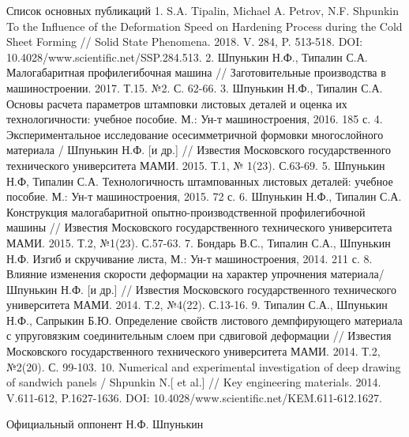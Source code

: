 Список основных публикаций
1. S.A. Tipalin, Michael A. Petrov, N.F. Shpunkin To the Influence of the Deformation Speed on Hardening Process during the Cold Sheet Forming // Solid State Phenomena. 2018. V. 284, P. 513-518. DOI: 10.4028/www.scientific.net/SSP.284.513.
2. Шпунькин Н.Ф., Типалин С.А. Малогабаритная профилегибочная машина // Заготовительные производства в машиностроении. 2017. Т.15. №2. 
С. 62-66.
3. Шпунькин Н.Ф., Типалин С.А. Основы расчета параметров штамповки листовых деталей и оценка их технологичности: учебное пособие. М.: Ун-т машиностроения, 2016. 185 с.
4. Экспериментальное исследование осесимметричной формовки многослойного материала / Шпунькин Н.Ф. [и др.] // Известия Московского государственного технического университета МАМИ. 2015. Т.1, № 1(23). С.63-69. 
5. Шпунькин Н.Ф, Типалин С.А. Технологичность штампованных листовых деталей: учебное пособие. М.: Ун-т машиностроения, 2015. 72 с.
6. Шпунькин Н.Ф., Типалин С.А. Конструкция малогабаритной опытно-производственной профилегибочной машины // Известия Московского государственного технического университета МАМИ. 2015. Т.2, №1(23). С.57-63.
7. Бондарь В.С., Типалин С.А., Шпунькин Н.Ф. Изгиб и скручивание листа, М.: Ун-т машиностроения, 2014. 211 с.
8. Влияние изменения скорости деформации на характер упрочнения материала/ Шпунькин Н.Ф. [и др.] // Известия Московского государственного технического университета МАМИ. 2014. Т.2, №4(22). С.13-16.
9. Типалин С.А., Шпунькин Н.Ф., Сапрыкин Б.Ю. Определение свойств листового демпфирующего материала с упруговязким соединительным слоем при сдвиговой деформации // Известия Московского государственного технического университета МАМИ. 2014. Т.2, №2(20). С. 99-103.
10. Numerical and experimental investigation of deep drawing of sandwich panels / Shpunkin N.[ et al.] // Key engineering materials. 2014. V.611-612, P.1627-1636. DOI: 10.4028/www.scientific.net/KEM.611-612.1627.	



Официальный оппонент		Н.Ф. Шпунькин

\clearpage